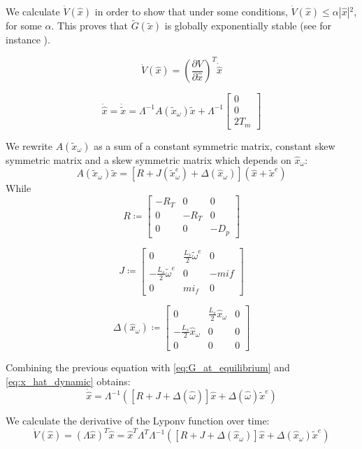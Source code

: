 \documentclass[conference]{IEEEtran}
\begin{document}
We calculate $\dot{V}(\hat{x})$ in order to show that under some
conditions, $\dot{V}(\hat{x})\leq\alpha|\hat{x}|{}^{2}$, for some
$\alpha.$ This  proves that $\tilde{G}(\tilde{x})$ is globally
exponentially stable (see for instance \cite{Sastry}).

$$
\dot{V}(\hat{x})=\left(\frac{\partial V}{\partial\hat{x}}\right)^{T}\dot{\hat{x}}
$$

\begin{equation}
\dot{\hat{x}}=\dot{\tilde{x}}=\varLambda^{-1}A(\tilde{x}_\omega)\tilde{x}+\varLambda^{-1}\left[\begin{array}{c}
0\\
0\\
2T_{m}
\end{array}\right]\label{eq:x_hat_dynamic}
\end{equation}

We rewrite  $A(\tilde{x}_{\omega})$ as a sum of a constant symmetric
matrix, constant skew symmetric matrix and a skew symmetric matrix
which depends on $\hat{x}_{\omega}$:
$$ 
A(\tilde{x}_{\omega})\tilde{x}=\left[R+J(\tilde{x}_{\omega}^{e})+\Delta(\hat{x}_{\omega})\right](\hat{x}+\tilde{x}^{e})
$$
While
$$
R\coloneqq\left[\begin{array}{ccc}
-R_T & 0 & 0\\
0 & -R_T & 0\\
0 & 0 & -D_{p}
\end{array}\right]
$$

$$
J\coloneqq\left[\begin{array}{ccc}
0 & \frac{L_{s}}{2}\tilde{\omega}^{e} & 0\\
-\frac{L_{s}}{2}\tilde{\omega}^{e} & 0 & -mif\\
0 & mi_{f} & 0
\end{array}\right]
$$

$$
\Delta(\hat{x}_{\omega})\coloneqq\left[\begin{array}{ccc}
0 & \frac{L_{s}}{2}\hat{x}_{\omega} & 0\\
-\frac{L_{s}}{2}\hat{x}_{\omega} & 0 & 0\\
0 & 0 & 0
\end{array}\right]
$$



Combining the previous equation with \eqref{eq:G_at_equilibrium} and \eqref{eq:x_hat_dynamic}
obtains: 
$$
\dot{\hat{x}}=\Lambda^{-1}\left( \left[R+J+\Delta(\hat{\omega})\right]\hat{x}+\Delta(\hat{\omega})\tilde{x}^{e}\right) 
$$

We calculate the derivative of the Lyponv function over  time: 
$$
\dot{V}(\hat{x})=\left(\Lambda\hat{x}\right)^{T}\dot{\hat{x}}=\hat{x}^{T}\Lambda^{T}\Lambda^{-1}\left( \left[R+J+\Delta(\hat{x}_{\omega})\right]\hat{x}+\Delta(\hat{x}_{\omega})\tilde{x}^{e}\right)
$$
\end{document}
